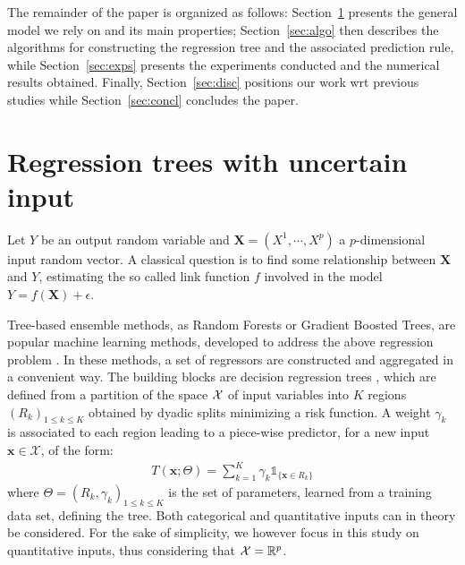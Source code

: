 \documentclass[twoside,11pt]{article}
\begin{document}
The remainder of the paper is organized as follows: Section~\ref{sec:model} presents the general model we rely on and its main properties; Section~\ref{sec:algo} then describes the algorithms for constructing the regression tree and the associated prediction rule, while Section~\ref{sec:exps} presents the experiments conducted and the numerical results obtained. Finally, Section~\ref{sec:disc} positions our work wrt previous studies while Section~\ref{sec:concl} concludes the paper.

\section{Regression trees with uncertain input}
\label{sec:model}

Let $Y$ be an output random variable and $\boldsymbol{X} = (X^1,\cdots,X^p)$ a $p$-dimensional input random vector. A classical question is to find some relationship between $\boldsymbol{X}$ and $Y$, estimating the so called link function $f$ involved in the model $Y=f(\boldsymbol{X})+\epsilon$.

Tree-based ensemble methods, as Random Forests or Gradient Boosted Trees, are popular machine learning methods, developed to address the above regression problem \cite{HastieTibshiraniFriedman}. In these methods, a set of regressors are constructed and aggregated in a convenient way. The building blocks are decision regression trees \cite{breiman1984classification}, which are defined from a partition of the space ${\cal X}$ of input variables into $K$ regions $(R_k)_{1\leq k \leq K}$ obtained by dyadic splits minimizing a risk function. A weight $\gamma_k$ is associated to each region leading to a piece-wise predictor, for a new input $\boldsymbol{x} \in \mathcal{X}$, of the form:
%
\begin{align}
T\left(\boldsymbol{x}; \Theta\right) = \sum_{k=1}^K \gamma_k \mathds{1}_{\lbrace \boldsymbol{x} \in R_k \rbrace}
\label{treeClassical}
\end{align}
%
where $\Theta = (R_k, \gamma_k)_{1\leq k \leq K}$ is the set of parameters, learned from a training data set, defining the tree. Both categorical and quantitative inputs can in theory be considered. For the sake of simplicity, we however focus in this study on quantitative inputs, thus considering that ${\cal X} = \mathbb{R}^p$.
\end{document}
